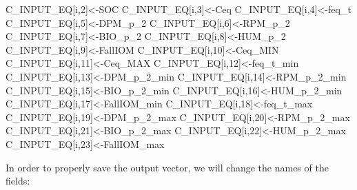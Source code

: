 \documentclass[
  10pt,
  b5paper,
]{book}
\newenvironment{Shaded}{\begin{snugshade}}{\end{snugshade}}
\newcommand{\DecValTok}[1]{\textcolor[rgb]{0.00,0.00,0.81}{#1}}
\newcommand{\NormalTok}[1]{#1}
\newcommand{\OtherTok}[1]{\textcolor[rgb]{0.56,0.35,0.01}{#1}}
\begin{document}
\begin{Shaded}
\begin{Highlighting}[]
\NormalTok{C\_INPUT\_EQ[i,}\DecValTok{2}\NormalTok{]}\OtherTok{\textless{}{-}}\NormalTok{SOC}
\NormalTok{C\_INPUT\_EQ[i,}\DecValTok{3}\NormalTok{]}\OtherTok{\textless{}{-}}\NormalTok{Ceq}
\NormalTok{C\_INPUT\_EQ[i,}\DecValTok{4}\NormalTok{]}\OtherTok{\textless{}{-}}\NormalTok{feq\_t}
\NormalTok{C\_INPUT\_EQ[i,}\DecValTok{5}\NormalTok{]}\OtherTok{\textless{}{-}}\NormalTok{DPM\_p\_2}
\NormalTok{C\_INPUT\_EQ[i,}\DecValTok{6}\NormalTok{]}\OtherTok{\textless{}{-}}\NormalTok{RPM\_p\_2}
\NormalTok{C\_INPUT\_EQ[i,}\DecValTok{7}\NormalTok{]}\OtherTok{\textless{}{-}}\NormalTok{BIO\_p\_2}
\NormalTok{C\_INPUT\_EQ[i,}\DecValTok{8}\NormalTok{]}\OtherTok{\textless{}{-}}\NormalTok{HUM\_p\_2}
\NormalTok{C\_INPUT\_EQ[i,}\DecValTok{9}\NormalTok{]}\OtherTok{\textless{}{-}}\NormalTok{FallIOM}
\NormalTok{C\_INPUT\_EQ[i,}\DecValTok{10}\NormalTok{]}\OtherTok{\textless{}{-}}\NormalTok{Ceq\_MIN}
\NormalTok{C\_INPUT\_EQ[i,}\DecValTok{11}\NormalTok{]}\OtherTok{\textless{}{-}}\NormalTok{Ceq\_MAX}
\NormalTok{C\_INPUT\_EQ[i,}\DecValTok{12}\NormalTok{]}\OtherTok{\textless{}{-}}\NormalTok{feq\_t\_min}
\NormalTok{C\_INPUT\_EQ[i,}\DecValTok{13}\NormalTok{]}\OtherTok{\textless{}{-}}\NormalTok{DPM\_p\_2\_min}
\NormalTok{C\_INPUT\_EQ[i,}\DecValTok{14}\NormalTok{]}\OtherTok{\textless{}{-}}\NormalTok{RPM\_p\_2\_min}
\NormalTok{C\_INPUT\_EQ[i,}\DecValTok{15}\NormalTok{]}\OtherTok{\textless{}{-}}\NormalTok{BIO\_p\_2\_min}
\NormalTok{C\_INPUT\_EQ[i,}\DecValTok{16}\NormalTok{]}\OtherTok{\textless{}{-}}\NormalTok{HUM\_p\_2\_min}
\NormalTok{C\_INPUT\_EQ[i,}\DecValTok{17}\NormalTok{]}\OtherTok{\textless{}{-}}\NormalTok{FallIOM\_min}
\NormalTok{C\_INPUT\_EQ[i,}\DecValTok{18}\NormalTok{]}\OtherTok{\textless{}{-}}\NormalTok{feq\_t\_max}
\NormalTok{C\_INPUT\_EQ[i,}\DecValTok{19}\NormalTok{]}\OtherTok{\textless{}{-}}\NormalTok{DPM\_p\_2\_max}
\NormalTok{C\_INPUT\_EQ[i,}\DecValTok{20}\NormalTok{]}\OtherTok{\textless{}{-}}\NormalTok{RPM\_p\_2\_max}
\NormalTok{C\_INPUT\_EQ[i,}\DecValTok{21}\NormalTok{]}\OtherTok{\textless{}{-}}\NormalTok{BIO\_p\_2\_max}
\NormalTok{C\_INPUT\_EQ[i,}\DecValTok{22}\NormalTok{]}\OtherTok{\textless{}{-}}\NormalTok{HUM\_p\_2\_max}
\NormalTok{C\_INPUT\_EQ[i,}\DecValTok{23}\NormalTok{]}\OtherTok{\textless{}{-}}\NormalTok{FallIOM\_max}
\end{Highlighting}
\end{Shaded}

In order to properly save the output vector, we will change the names of the fields:
\end{document}

